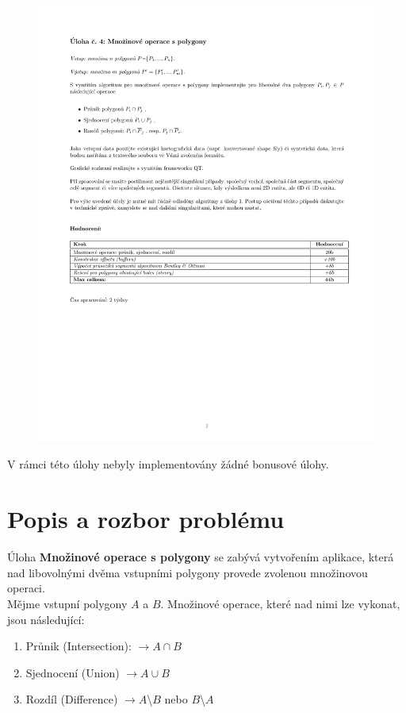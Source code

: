 \documentclass[a4paper, 12pt]{article}
\begin{document}
\begin{figure}[h!]
	\includegraphics[clip, trim=0cm 8.5cm 0cm 3cm, width=1.0\textwidth]{./pictures/zadani04.pdf}
\end{figure}

V rámci této úlohy nebyly implementovány žádné bonusové úlohy.
\clearpage

\section{Popis a rozbor problému}
Úloha \textbf{Množinové operace s polygony} se zabývá vytvořením aplikace, která nad libovolnými dvěma vstupními polygony provede zvolenou množinovou operaci. \\

Mějme vstupní polygony $A$ a $B$. Množinové operace, které nad nimi lze vykonat, jsou následující:
\begin{enumerate}
\item Průnik (Intersection): $\longrightarrow A \cap B$
\item Sjednocení (Union) $\longrightarrow A \cup B$
\item Rozdíl (Difference) $\longrightarrow A$\textbackslash $B$ nebo $B$\textbackslash $A$
\end{enumerate}
\end{document}
